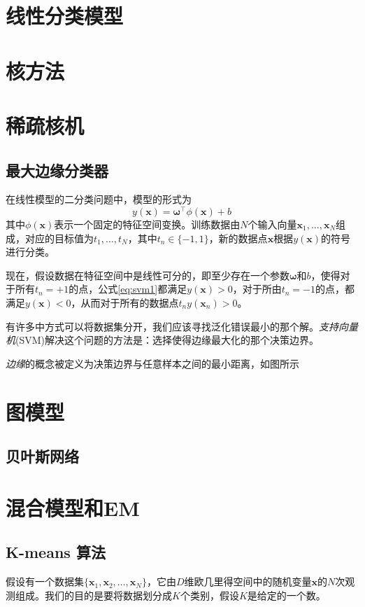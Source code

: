 \documentclass[11pt]{ctexbook}
\begin{document}
\chapter{线性分类模型}

\chapter{核方法}

\chapter{稀疏核机}
\section{最大边缘分类器}
在线性模型的二分类问题中，模型的形式为
\begin{equation}
	\label{eq:svm1}
	y(\bm x) = \bm \omega^\top\phi(\bm x) + b
\end{equation}
其中$\phi(\bm x)$表示一个固定的特征空间变换。训练数据由$N$个输入向量$\bm x_1, \ldots,\bm x_N$组成，对应的目标值为$t_1, \ldots, t_N$，其中$t_n \in \{ -1, 1\}$，新的数据点$\bm x$根据$y(\bm x)$的符号进行分类。

现在，假设数据在特征空间中是线性可分的，即至少存在一个参数$\bm \omega$和$b$，使得对于所有$t_n=+1$的点，公式\ref{eq:svm1}都满足$y(\bm x) > 0$，对于所由$t_n = -1$的点，都满足$y(\bm x) < 0$，从而对于所有的数据点$t_n y(\bm x_n) > 0$。

有许多中方式可以将数据集分开，我们应该寻找泛化错误最小的那个解。\emph{支持向量机}(SVM)解决这个问题的方法是：选择使得边缘最大化的那个决策边界。

\emph{边缘}的概念被定义为决策边界与任意样本之间的最小距离，如图所示

\chapter{图模型}
\section{贝叶斯网络}

\chapter{混合模型和EM}
\section{K-means 算法}
假设有一个数据集$\{ \bm x_1, \bm x_2, \ldots, \bm x_N\}$，它由$D$维欧几里得空间中的随机变量$\bm x$的$N$次观测组成。我们的目的是要将数据划分成$K$个类别，假设$K$是给定的一个数。
\end{document}
